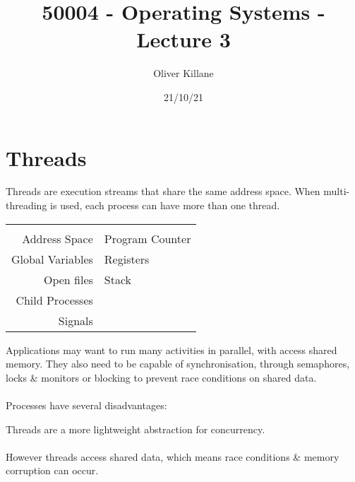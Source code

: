 \documentclass{report}
\title{50004 - Operating Systems - Lecture 3}
\author{Oliver Killane}
\date{21/10/21}
\begin{document}
\maketitle
{}

\section*{Threads}
Threads are execution streams that share the same address space. When multi-threading is used, each process can have more than one thread.
\begin{center}
	\begin{tabular}{r l}
		\keyword{Process} & \keyword{Thread} \\
		Address Space     & Program Counter  \\
		Global Variables  & Registers        \\
		Open files        & Stack            \\
		Child Processes                      \\
		Signals                              \\
	\end{tabular}
\end{center}

Applications may want to run many activities in parallel, with access shared memory. They also need to be capable of synchronisation, through semaphores, locks \& monitors or blocking to prevent race conditions on shared data.
\\
\\ Processes have several disadvantages:
\begin{itemize}
\end{itemize}
Threads are a more lightweight abstraction for concurrency.
\\
\\ However threads access shared data, which means race conditions \& memory corruption can occur.
\end{document}
